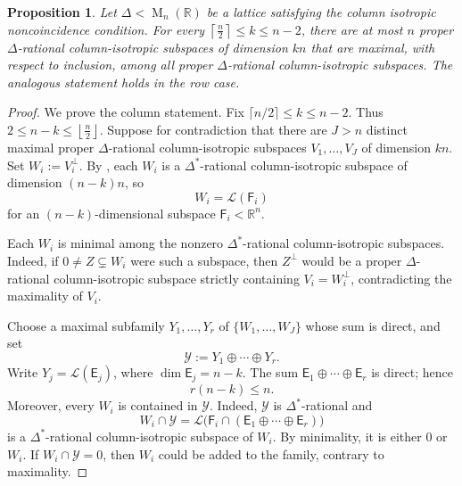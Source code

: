 \documentclass[reqno,11pt]{amsart}
\numberwithin{equation}{section}
\newtheorem{proposition}[theorem]{Proposition}
\theoremstyle{definition}
\theoremstyle{remark}
\newcommand{\op}{\operatorname}
\newcommand{\R}{\mathbb R}
\newcommand{\M}{\op{M}}
\begin{document}
\begin{proposition}
\label{prop:finitely-many-maximal-isotropic}
Let $\Delta<\M_n(\R)$ be a lattice satisfying the column isotropic
noncoincidence condition. For every
$\left\lceil\frac n2\right\rceil\le k\le n-2$,
there are at most $n$ proper $\Delta$-rational column-isotropic
subspaces of dimension $kn$ that are maximal, with respect to inclusion,
among all proper $\Delta$-rational column-isotropic subspaces.
The analogous statement holds in the row case.
\end{proposition}
\begin{proof}
We prove the column statement. Fix
$\lceil n/2\rceil\le k\le n-2$. Thus
$2\le n-k \le\left\lfloor\frac n2\right\rfloor$.
Suppose for contradiction that there are $J>n$ distinct maximal
proper $\Delta$-rational column-isotropic subspaces
$V_1,\ldots,V_J$ of dimension $kn$. Set $W_i:=V_i^\perp$. By
, each $W_i$ is a
$\Delta^*$-rational column-isotropic subspace of dimension $(n-k)n$,
so
$$
W_i=\mathcal{L}(\mathsf F_i)
$$
for an $(n-k)$-dimensional subspace $\mathsf F_i<\R^n$.

Each $W_i$ is minimal among the nonzero $\Delta^*$-rational
column-isotropic subspaces. Indeed, if
$0\ne Z\subsetneq W_i$ were such a subspace, then
$Z^\perp$ would be a proper $\Delta$-rational column-isotropic
subspace strictly containing $V_i=W_i^\perp$, contradicting the
maximality of $V_i$.

Choose a maximal subfamily $Y_1,\ldots,Y_r$ of
$\{W_1,\ldots,W_J\}$ whose sum is direct, and set
$$
\mathcal Y:=Y_1\oplus\cdots\oplus Y_r.
$$
Write $Y_j=\mathcal{L}(\mathsf E_j)$, where $\dim \mathsf E_j=n-k$. The sum
$\mathsf E_1\oplus\cdots\oplus \mathsf E_r$ is direct; hence
\begin{equation}\label{eq:number-direct-isotropic-summands}
r(n-k)\le n.
\end{equation}
Moreover, every $W_i$ is contained in $\mathcal Y$. Indeed,
$\mathcal Y$ is $\Delta^*$-rational and
$$
W_i\cap\mathcal Y
=
\mathcal{L}\bigl(\mathsf F_i\cap(\mathsf E_1\oplus\cdots\oplus \mathsf E_r)\bigr)
$$
is a $\Delta^*$-rational column-isotropic subspace of $W_i$. By
minimality, it is either $0$ or $W_i$. If $W_i\cap\mathcal Y=0$, then
$W_i$ could be added to the family, contrary to maximality.


\end{proof}
\end{document}
